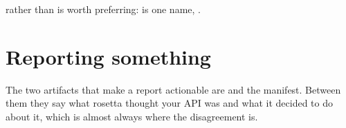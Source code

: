  rather than  is worth preferring: 
is one name, .

\section{Reporting something}

The two artifacts that make a report actionable are 
and the manifest. Between them they say what rosetta thought your API was and
what it decided to do about it, which is almost always where the disagreement
is.
